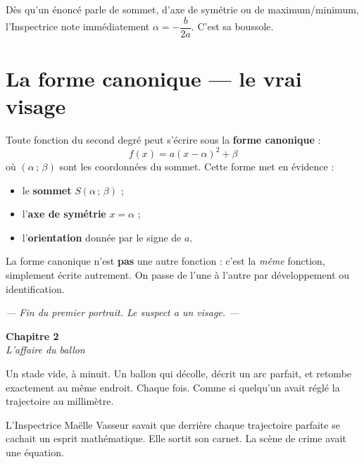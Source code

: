 \documentclass[11pt,a4paper]{article}
\newcommand{\chapterheader}[2]{%
  \clearpage
  \begin{tcolorbox}[
    enhanced,
    colback=ink, colframe=ink,
    interior style={top color=ink, bottom color=charcoal, shading angle=90},
    boxrule=0pt, arc=0pt,
    left=18pt, right=18pt, top=14pt, bottom=14pt,
    width=\textwidth,
  ]
    {\color{white}\Huge\bfseries #1}\\[6pt]
    {\color{silver}\large\itshape #2}
  \end{tcolorbox}
  \vspace{6pt}
}
\begin{document}
\begin{methode}
Dès qu'un énoncé parle de sommet, d'axe de symétrie ou de maximum/minimum, l'Inspectrice note immédiatement $\alpha = -\dfrac{b}{2a}$. C'est sa boussole.
\end{methode}

\section{La forme canonique — le vrai visage}

\begin{indice}
Toute fonction du second degré peut s'écrire sous la \textbf{forme canonique} :
\[
  \boxed{\;f(x) = a(x-\alpha)^2 + \beta\;}
\]
où $(\alpha\,;\,\beta)$ sont les coordonnées du sommet.
Cette forme met en évidence :
\begin{itemize}[leftmargin=*]
  \item le \textbf{sommet} $S(\alpha\,;\,\beta)$ ;
  \item l'\textbf{axe de symétrie} $x = \alpha$ ;
  \item l'\textbf{orientation} donnée par le signe de $a$.
\end{itemize}
\end{indice}

\begin{alerte}
La forme canonique n'est \textbf{pas} une autre fonction : c'est la \emph{même} fonction, simplement écrite autrement. On passe de l'une à l'autre par développement ou identification.
\end{alerte}

\vfill
\begin{center}
\textcolor{slate}{\itshape\small — Fin du premier portrait. Le suspect a un visage. —}
\end{center}

\chapterheader{Chapitre 2}{L'affaire du ballon}

Un stade vide, à minuit. Un ballon qui décolle, décrit un arc parfait, et retombe exactement au même endroit. Chaque fois. Comme si quelqu'un avait réglé la trajectoire au millimètre.

L'Inspectrice Maëlle Vasseur savait que derrière chaque trajectoire parfaite se cachait un esprit mathématique. Elle sortit son carnet. La scène de crime avait une équation.
\end{document}
